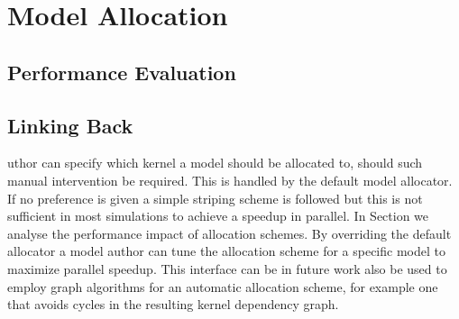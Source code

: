 \section{Model Allocation}

\subsection{Performance Evaluation}

\subsection{Linking Back}

uthor can specify which kernel a model should be allocated to, should such manual intervention be required. This is handled by the default model allocator. If no preference is given a simple striping scheme is followed but this is not sufficient in most simulations to achieve a speedup in parallel. In Section  we analyse the performance impact of allocation schemes. By overriding the default allocator a model author can tune the allocation scheme for a specific model to maximize parallel speedup. This interface can be in future work also be used to employ graph algorithms for an automatic allocation scheme, for example one that avoids cycles in the resulting kernel dependency graph.
